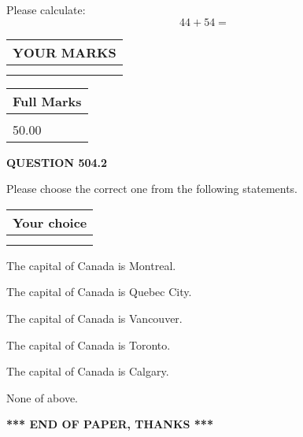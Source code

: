 \documentclass[12pt]{article}
\begin{document}
  
 
Please calculate:
\begin{equation}
44 +  %
54 = \nonumber
\end{equation}
 

 

 
  
\vspace{0.2in}
  
\noindent\begin{tabular}{|l|}
\hline
 YOUR MARKS  \\
\hline
 \\ 
 \\ 
\hline
\end{tabular}
\hspace{0.05in} \begin{tabular}{|l|}
\hline
 Full Marks  \\
\hline
 \\ 
50.00 \\
\hline
\end{tabular}
{\textbf{\Large{QUESTION
504.2 
}}}
  
  
Please choose the correct one from the following statements.
  
  
\noindent\hspace{3.0in} \begin{tabular}{|l|}
\hline
Your choice \\
\hline
 \\ 
 \\ 
\hline
\end{tabular}
  
  
 
 
The capital of Canada is Montreal.
 
 
The capital of Canada is Quebec City.
 
 
The capital of Canada is Vancouver.
 
 
The capital of Canada is Toronto.
 
 
The capital of Canada is Calgary.
 
 
 None of above.
 
 
   
   
 \vspace{0.2in}
 
   
   
   
   
\vspace{1.0in} 
{\textbf{\large{ *** END OF PAPER, THANKS *** }}} 
   
\end{document}
